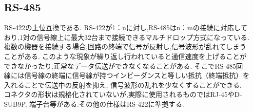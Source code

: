 \documentclass[12pt,oneside]{paper}
\begin{document}
\subsection{RS-485}
RS-422の上位互換である.
RS-422が1：nに対し,RS-485はn：mの接続に対応しており,1対の信号線上に最大32台まで接続できるマルチドロップ方式になっている. 
複数の機器を接続する場合,回路の終端で信号が反射し,信号波形が乱れてしまうことがある.
このような現象が繰り返し行われていると通信速度を上げることができなかったり,正常なデータ伝送ができなくなることがある.
そこでRS-485回線には信号線の終端に信号線が持つインピーダンスと等しい抵抗（終端抵抗）を入れることで伝送中の反射を抑え,
信号波形の乱れを少なくすることができる. コネクタの形状は規格化されていないが,実際に使用されるものではRJ-45やD-SUB9P,
端子台等がある.その他の仕様はRS-422に準拠する.

\begin{table}[h]
 \begin{center}
  \label{Serial}
  \caption{Serial通信一覧}
 \end{center}
\end{table}
\end{document}
